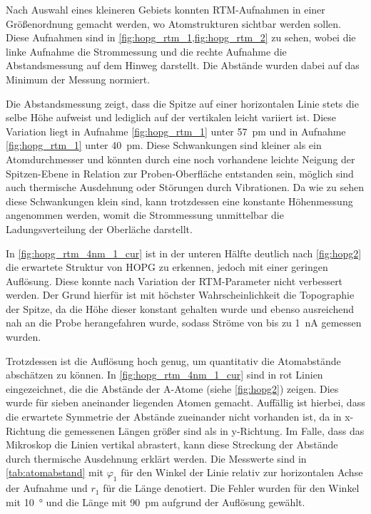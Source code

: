 Nach Auswahl eines kleineren Gebiets konnten RTM-Aufnahmen in einer Größenordnung gemacht werden, wo 
Atomstrukturen sichtbar werden sollen. Diese Aufnahmen sind in \cref{fig:hopg_rtm_1,fig:hopg_rtm_2} zu sehen, wobei 
die linke Aufnahme die Strommessung und die rechte Aufnahme die Abstandsmessung auf dem Hinweg darstellt.
Die Abstände wurden dabei auf das Minimum der Messung normiert.\par
Die Abstandsmessung zeigt, dass die 
Spitze auf einer horizontalen Linie stets die selbe Höhe aufweist und lediglich auf der vertikalen leicht variiert ist.
Diese Variation liegt in Aufnahme \ref{fig:hopg_rtm_1} unter \SI{57}{\pm} und in Aufnahme \ref{fig:hopg_rtm_1}
unter \SI{40}{\pm}. Diese Schwankungen sind kleiner als ein Atomdurchmesser und könnten durch eine noch 
vorhandene leichte Neigung der Spitzen-Ebene in Relation zur Proben-Oberfläche entstanden sein, möglich sind auch 
thermische Ausdehnung oder Störungen durch Vibrationen. Da wie zu sehen diese Schwankungen klein sind, kann 
trotzdessen eine konstante Höhenmessung angenommen werden, womit die Strommessung unmittelbar die 
Ladungsverteilung der Oberläche darstellt.




In \cref{fig:hopg_rtm_4nm_1_cur} ist in der unteren Hälfte deutlich nach \cref{fig:hopg2} die erwartete Struktur 
von HOPG zu erkennen, jedoch mit einer geringen Auflösung. Diese konnte nach Variation der 
RTM-Parameter nicht verbessert werden. Der Grund hierfür ist mit höchster Wahrscheinlichkeit die Topographie 
der Spitze, da die Höhe dieser konstant gehalten wurde und ebenso ausreichend nah an die Probe 
herangefahren wurde, sodass Ströme von bis zu \SI{1}{\nano\ampere} gemessen wurden.\par
Trotzdessen ist die Auflösung hoch genug, um quantitativ die Atomabstände abschätzen zu können.
In \cref{fig:hopg_rtm_4nm_1_cur} sind in rot Linien eingezeichnet, die die Abstände der A-Atome (siehe 
\cref{fig:hopg2}) zeigen. Dies wurde für sieben aneinander liegenden Atomen gemacht. Auffällig ist
hierbei, dass die erwartete Symmetrie der Abstände zueinander nicht vorhanden ist, da in 
x-Richtung die gemessenen Längen größer sind als in y-Richtung. Im Falle, dass das Mikroskop 
die Linien vertikal abrastert, kann diese Streckung der Abstände durch thermische Ausdehnung 
erklärt werden. Die Messwerte sind in \cref{tab:atomabstand} mit $\varphi_1$ für den Winkel der 
Linie relativ zur horizontalen Achse der Aufnahme und $r_1$ für die Länge denotiert. Die 
Fehler wurden für den Winkel mit \SI{10}{\degree} und die Länge mit \SI{90}{\pm} aufgrund 
der Auflösung gewählt.\par



